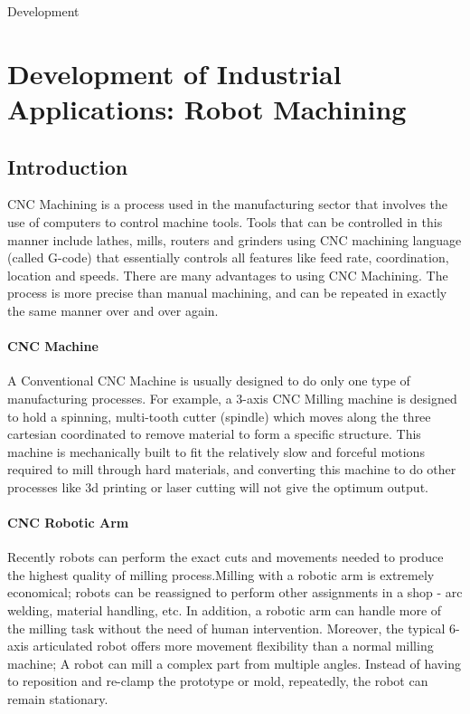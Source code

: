 \documentclass[a4paper]{book}
\begin{document}
	\begin{chapter}{Development}

\tableofcontents
\newpage		
		
\section{Development of Industrial Applications: Robot Machining}
\subsection{Introduction}
CNC Machining is a process used in the manufacturing sector that involves the use of computers to control machine tools. Tools that can be controlled in this manner include lathes, mills, routers and grinders using CNC machining language (called G-code) that essentially controls all features like feed rate, coordination, location and speeds. There are many advantages to using CNC Machining. The process is more precise than manual machining, and can be repeated in exactly the same manner over and over again.
\paragraph{CNC Machine} A Conventional CNC Machine is usually designed to do only one type of manufacturing processes. For example, a 3-axis CNC Milling machine is designed to hold a spinning, multi-tooth cutter (spindle) which moves along the three cartesian coordinated to remove material to form a specific structure. This machine is mechanically built to fit the relatively slow and forceful motions required to mill through hard materials, and converting this machine to do other processes like 3d printing or laser cutting will not give the optimum output.
\paragraph{CNC Robotic Arm } Recently robots can perform the exact cuts and movements needed to produce the highest quality of milling process.Milling with a robotic arm is extremely economical; robots can be reassigned to perform other assignments in a shop - arc welding, material handling, etc. In addition, a robotic arm can handle more of the milling task without the need of human intervention. Moreover, the typical 6-axis articulated robot offers more movement flexibility than a normal milling machine; A robot can mill a complex part from multiple angles. Instead of having to reposition and re-clamp the prototype or mold, repeatedly, the robot can remain stationary. 

\end{chapter}
\end{document}
